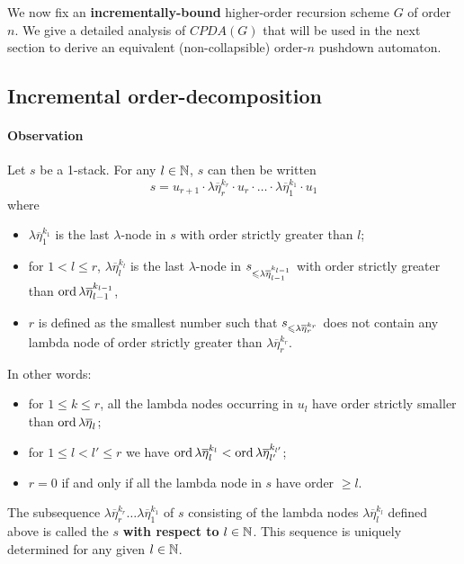 \documentclass[a4paper,draft]{article}[12pt]
\theoremstyle{remark}
\theoremstyle{definition}
\begin{document}
We now fix an {\bf incrementally-bound} higher-order recursion scheme $G$ of order $n$.
We give a detailed analysis of $CPDA(G)$ that will be used in the next section to derive an equivalent (non-collapsible) order-$n$ pushdown automaton.

\subsection{Incremental order-decomposition}
\paragraph{Observation}
Let $s$ be a 1-stack. For any $l\in \mathbb{N}$, $s$ can then be written
$$ s = u_{r+1} \cdot \lambda \overline{\eta}_r^{k_r} \cdot u_r \cdot
\ldots \cdot \lambda \overline{\eta}_1^{k_1} \cdot  u_1 $$
where
\begin{itemize}
\item  $\lambda \overline{\eta}_1^{k_1}$ is the
last $\lambda$-node in $s$ with order strictly greater than $l$;

\item for $1 < l \leq r$, $\lambda
\overline{\eta}_l^{k_l}$ is the last $\lambda$-node in $s_{\leqslant
\lambda \overline{\eta}_{l-1}^{k_{l-1}}}$ with order strictly
greater than $\mathop{\mathrm{ord}}{\lambda \overline{\eta}_{l-1}^{k_{l-1}}}$,

\item  $r$ is defined as the smallest number such that
$s_{\leqslant \lambda \overline{\eta}_{r}^{k_{r}}}$ does not contain
any lambda node of order strictly greater than $\lambda
\overline{\eta}_{r}^{k_{r}}$.
\end{itemize}

\noindent In other words:
\begin{itemize}
\item for $1 \leq k \leq r$, all the lambda nodes occurring in $u_l$ have order
strictly smaller than $\mathop{\mathrm{ord}}{\lambda \overline{\eta}_l}$;
\item for $1\leq l<l'\leq r$ we have $\mathop{\mathrm{ord}}{\lambda \overline{\eta}_l^{k_l}}
< \mathop{\mathrm{ord}}{\lambda \overline{\eta}_{l'}^{k_{l'}}}$;
\item $r=0$ if and only if all the lambda node in $s$ have order $\geq l$.
\end{itemize}

The subsequence $\lambda \overline{\eta}_r^{k_r} \ldots \lambda\overline{\eta}_1^{k_1}$ of $s$ consisting of the lambda nodes $\lambda
\overline{\eta}_l^{k_l}$ defined above is called the  $s$ {\bf with respect to} $l\in\mathbb{N}$.
This sequence is uniquely determined for any given $l\in \mathbb{N}$.
\end{document}
